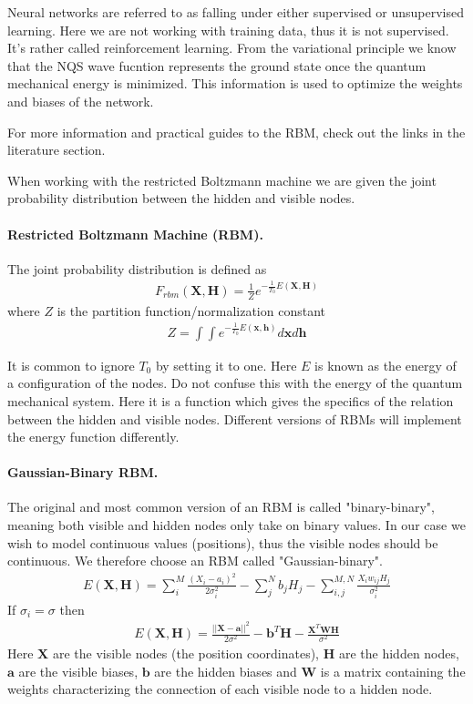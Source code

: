 \documentclass[%
oneside,                 %
final,                   %
10pt]{article}
\begin{document}
Neural networks are referred to as falling
under either supervised or unsupervised learning. Here we are not
working with training data, thus it is not supervised. It's rather
called reinforcement learning. From the variational principle we know
that the NQS wave fucntion represents the ground state once the
quantum mechanical energy is minimized. This information is used to
optimize the weights and biases of the network.

For more information and practical guides to the RBM, check out the links in the literature section.

When working with the restricted Boltzmann machine we are given the joint probability distribution between the hidden and visible nodes.

\paragraph{Restricted Boltzmann Machine (RBM).}
The joint probability distribution is defined as 
\begin{align}
	F_{rbm}(\mathbf{X},\mathbf{H}) = \frac{1}{Z} e^{-\frac{1}{T_0}E(\mathbf{X},\mathbf{H})}
\end{align}
where $Z$ is the partition function/normalization constant
\begin{align}
	Z = \int \int e^{-\frac{1}{T_0}E(\mathbf{x},\mathbf{h})} d\mathbf{x} d\mathbf{h}
\end{align}

It is common to ignore $T_0$ by setting it to one. Here $E$ is known
as the energy of a configuration of the nodes. Do not confuse this
with the energy of the quantum mechanical system. Here it is a
function which gives the specifics of the relation between the hidden
and visible nodes. Different versions of RBMs will implement the
energy function differently.

\paragraph{Gaussian-Binary RBM.}
The original and most common version of an RBM is called "binary-binary", meaning both visible and hidden nodes only take on binary values. In our case we wish to model continuous values (positions), thus the visible nodes should be continuous. We therefore choose an RBM called "Gaussian-binary". 
\begin{align}
	E(\mathbf{X}, \mathbf{H}) = \sum_i^M \frac{(X_i - a_i)^2}{2\sigma_i^2} - \sum_j^N b_j H_j - \sum_{i,j}^{M,N} \frac{X_i w_{ij} H_j}{\sigma_i^2} 
\end{align}
If $\sigma_i = \sigma$ then
\begin{align}
	E(\mathbf{X}, \mathbf{H})= \frac{||\mathbf{X} - \mathbf{a}||^2}{2\sigma^2} - \mathbf{b}^T \mathbf{H} - \frac{\mathbf{X}^T \mathbf{W} \mathbf{H}}{\sigma^2}
\end{align}
Here $\mathbf{X}$ are the visible nodes (the position coordinates), $\mathbf{H}$ are the hidden nodes, $\mathbf{a}$ are the visible biases, $\mathbf{b}$ are the hidden biases and $\mathbf{W}$ is a matrix containing the weights characterizing the connection of each visible node to a hidden node.
\end{document}
